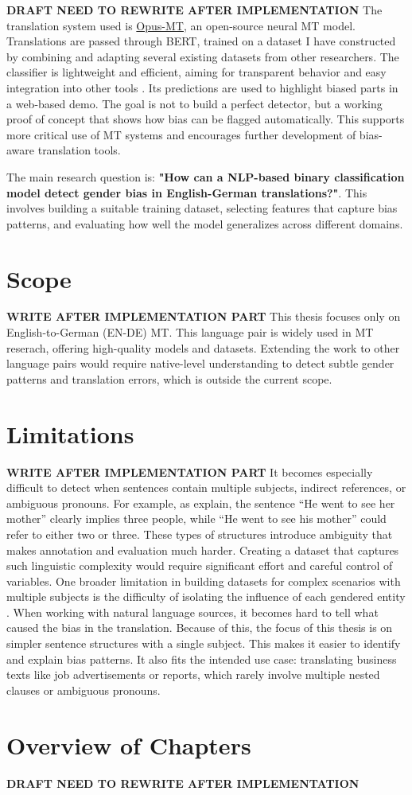 \textbf{DRAFT NEED TO REWRITE AFTER IMPLEMENTATION}
The translation system used is \href{https://github.com/Helsinki-NLP/Opus-MT?tab=readme-ov-file}{Opus-MT}, an open-source neural MT model. %
Translations are passed through BERT, trained on a dataset I have constructed by combining and adapting several existing datasets from other researchers. The classifier is lightweight and efficient, aiming for transparent behavior and easy integration into other tools \citep{devlinBERTPretrainingDeep2019}. Its predictions are used to highlight biased parts in a web-based demo. The goal is not to build a perfect detector, but a working proof of concept that shows how bias can be flagged automatically. This supports more critical use of MT systems and encourages further development of bias-aware translation tools.

The main research question is: \textbf{"How can a NLP-based binary classification model detect gender bias in English-German translations?"}. This involves building a suitable training dataset, selecting features that capture bias patterns, and evaluating how well the model generalizes across different domains.

\section{Scope}

\textbf{WRITE AFTER IMPLEMENTATION PART}
This thesis focuses only on English-to-German (EN-DE) MT. This language pair is widely used in MT reserach, offering high-quality models and datasets. Extending the work to other language pairs would require native-level understanding to detect subtle gender patterns and translation errors, which is outside the current scope. 

\section{Limitations}
\textbf{WRITE AFTER IMPLEMENTATION PART}
It becomes especially difficult to detect when sentences contain multiple subjects, indirect references, or ambiguous pronouns. For example, as \citet{barclayInvestigatingMarkersDrivers2024a} explain, the sentence “He went to see her mother” clearly implies three people, while “He went to see his mother” could refer to either two or three. These types of structures introduce ambiguity that makes annotation and evaluation much harder. Creating a dataset that captures such linguistic complexity would require significant effort and careful control of variables. One broader limitation in building datasets for complex scenarios with multiple subjects is the difficulty of isolating the influence of each gendered entity \citep{lardelliBuildingBridgesDataset2024}. When working with natural language sources, it becomes hard to tell what caused the bias in the translation. Because of this, the focus of this thesis is on simpler sentence structures with a single subject. This makes it easier to identify and explain bias patterns. It also fits the intended use case: translating business texts like job advertisements or reports, which rarely involve multiple nested clauses or ambiguous pronouns.
 

\section{Overview of Chapters}
\textbf{DRAFT NEED TO REWRITE AFTER IMPLEMENTATION}
